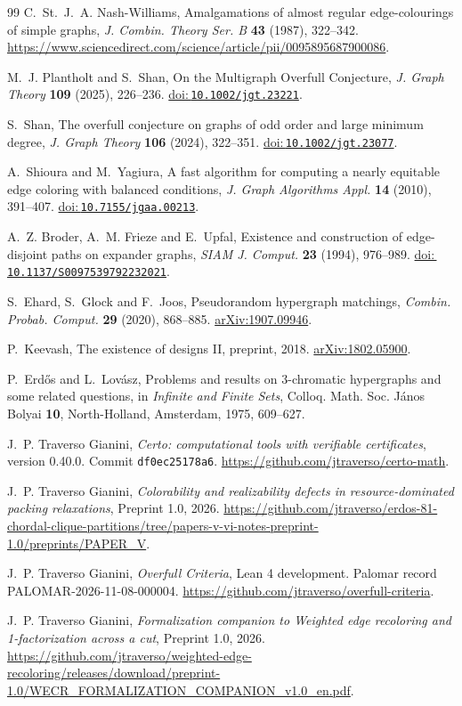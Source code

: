 \documentclass[11pt]{article}
\begin{document}
\begin{thebibliography}{99}
C.~St.~J.~A. Nash-Williams,
Amalgamations of almost regular edge-colourings of simple graphs,
\emph{J. Combin. Theory Ser. B} \textbf{43} (1987), 322--342. \url{https://www.sciencedirect.com/science/article/pii/0095895687900086}.


M.~J. Plantholt and S.~Shan,
On the Multigraph Overfull Conjecture,
\emph{J. Graph Theory} \textbf{109} (2025), 226--236.
\href{https://doi.org/10.1002/jgt.23221}{doi:\,\nolinkurl{10.1002/jgt.23221}}.

S.~Shan,
The overfull conjecture on graphs of odd order and large minimum degree,
\emph{J. Graph Theory} \textbf{106} (2024), 322--351. \href{https://doi.org/10.1002/jgt.23077}{doi:\,\nolinkurl{10.1002/jgt.23077}}.

A.~Shioura and M.~Yagiura,
A fast algorithm for computing a nearly equitable edge coloring with balanced conditions,
\emph{J. Graph Algorithms Appl.} \textbf{14} (2010), 391--407.
\href{https://doi.org/10.7155/jgaa.00213}{doi:\,\nolinkurl{10.7155/jgaa.00213}}.

A.~Z. Broder, A.~M. Frieze and E.~Upfal,
Existence and construction of edge-disjoint paths on expander graphs,
\emph{SIAM J. Comput.} \textbf{23} (1994), 976--989.
\href{https://doi.org/10.1137/S0097539792232021}{doi:\,\nolinkurl{10.1137/S0097539792232021}}.

S.~Ehard, S.~Glock and F.~Joos,
Pseudorandom hypergraph matchings,
\emph{Combin. Probab. Comput.} \textbf{29} (2020), 868--885.
\href{https://arxiv.org/abs/1907.09946}{arXiv:1907.09946}.

P.~Keevash, The existence of designs II,
preprint, 2018.
\href{https://arxiv.org/abs/1802.05900}{arXiv:1802.05900}.

P.~Erd\H{o}s and L.~Lov\'asz,
Problems and results on 3-chromatic hypergraphs and some related questions,
in \emph{Infinite and Finite Sets}, Colloq. Math. Soc. J\'anos Bolyai \textbf{10},
North-Holland, Amsterdam, 1975, 609--627.


J.~P. Traverso Gianini, \emph{Certo: computational tools with verifiable certificates}, version 0.40.0. Commit \texttt{df0ec25178a6}. \url{https://github.com/jtraverso/certo-math}.

J.~P. Traverso Gianini,
\emph{Colorability and realizability defects in resource-dominated packing relaxations}, Preprint 1.0, 2026.
\url{https://github.com/jtraverso/erdos-81-chordal-clique-partitions/tree/papers-v-vi-notes-preprint-1.0/preprints/PAPER_V}.

J.~P. Traverso Gianini, \emph{Overfull Criteria}, Lean 4 development.
Palomar record PALOMAR-2026-11-08-000004.
\url{https://github.com/jtraverso/overfull-criteria}.

J.~P. Traverso Gianini,
\emph{Formalization companion to Weighted edge recoloring and 1-factorization across a cut}, Preprint 1.0, 2026.
\url{https://github.com/jtraverso/weighted-edge-recoloring/releases/download/preprint-1.0/WECR_FORMALIZATION_COMPANION_v1.0_en.pdf}.

\end{thebibliography}
\end{document}

